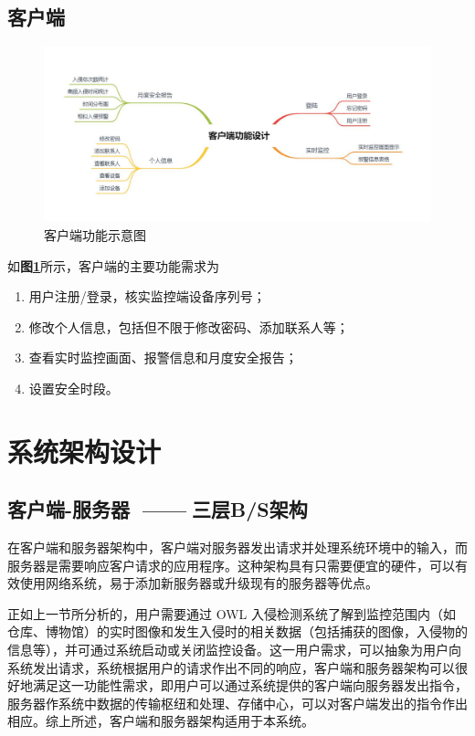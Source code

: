 \documentclass[article]{BJTU-thesis}
\begin{document}
\subsection{客户端}
\begin{figure}[!htbp]
	\centering
	\includegraphics{img/4.jpg}
	\caption{客户端功能示意图}\label{fig:fig4}
\end{figure}
如\textbf{图\ref{fig:fig4}}所示，客户端的主要功能需求为
\newpage
\begin{enumerate}
	\item 用户注册/登录，核实监控端设备序列号；
	\item 修改个人信息，包括但不限于修改密码、添加联系人等；
	\item 查看实时监控画面、报警信息和月度安全报告；
	\item 设置安全时段。
	
\end{enumerate}

\section{系统架构设计}
\subsection{客户端-服务器 $\;$——$\;$三层B/S架构}
在客户端和服务器架构中，客户端对服务器发出请求并处理系统环境中的输入，而服务器是需要响应客户请求的应用程序。这种架构具有只需要便宜的硬件，可以有效使用网络系统，易于添加新服务器或升级现有的服务器等优点。

正如上一节所分析的，用户需要通过 OWL 入侵检测系统了解到监控范围内（如仓库、博物馆）的实时图像和发生入侵时的相关数据（包括捕获的图像，入侵物的信息等），并可通过系统启动或关闭监控设备。这一用户需求，可以抽象为用户向系统发出请求，系统根据用户的请求作出不同的响应，客户端和服务器架构可以很好地满足这一功能性需求，即用户可以通过系统提供的客户端向服务器发出指令，服务器作系统中数据的传输枢纽和处理、存储中心，可以对客户端发出的指令作出相应。综上所述，客户端和服务器架构适用于本系统。
\end{document}
